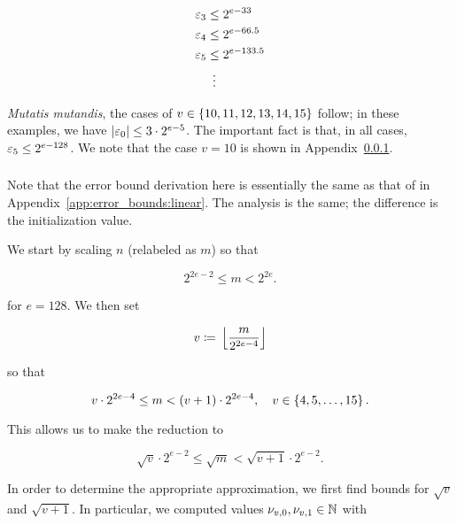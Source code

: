 \begin{itemize}
\begin{align}
    \varepsilon_{3} &\le 2^{e-33} \nonumber\\
    \varepsilon_{4} &\le 2^{e-66.5} \nonumber\\
    \varepsilon_{5} &\le 2^{e-133.5} \nonumber\\
        &\ \vdots
\end{align}

\emph{Mutatis mutandis},
the cases of $v\in\left\{ 10, 11, 12, 13, 14, 15 \right\}$ follow;
in these examples, we have $\left| \varepsilon_{0} \right| \le 3\cdot2^{e-5}$.
The important fact is that, in all cases, $\varepsilon_{5}\le 2^{e-128}$.
We note that the case $v=10$ is shown in
Appendix~\ref{app:error_bounds:hyper4}.
\end{itemize}


\subsubsection{\HyperFour{}}
\label{app:error_bounds:hyper4}

Note that the error bound derivation here is essentially
the same as that of \Linear{} in Appendix~\ref{app:error_bounds:linear}.
The analysis is the same; the difference is the initialization value.

We start by scaling $n$ (relabeled as $m$) so that

\begin{equation}
    2^{2e-2} \le m < 2^{2e}.
\end{equation}

\noindent
for $e = 128$.
We then set

\begin{equation}
    v \coloneqq{} \left\lfloor \frac{m}{2^{2e-4}} \right\rfloor
\end{equation}

\noindent
so that

\begin{equation}
    v\cdot2^{2e-4} \le m < \left( v+1 \right)\cdot2^{2e-4},
    \quad v\in\left\{ 4, 5, \dots, 15 \right\}.
\end{equation}

\noindent
This allows us to make the reduction to

\begin{equation}
    \sqrt{v}\cdot2^{e-2} \le \sqrt{m} < \sqrt{v+1}\cdot2^{e-2}.
    \label{eq:app_hyper4_m_bound}
\end{equation}

In order to determine the appropriate approximation,
we first find bounds for $\sqrt{v}$ and $\sqrt{v+1}$.
In particular, we computed values $\nu_{v,0}, \nu_{v,1}\in\mathbb{N}$ with

